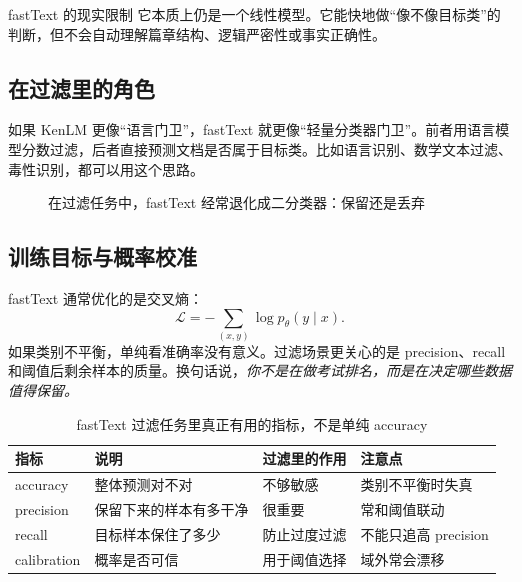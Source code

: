 \begin{warningbox}{fastText 的现实限制}
它本质上仍是一个线性模型。它能快地做“像不像目标类”的判断，但不会自动理解篇章结构、逻辑严密性或事实正确性。
\end{warningbox}

\subsection{在过滤里的角色}

如果 KenLM 更像“语言门卫”，fastText 就更像“轻量分类器门卫”。前者用语言模型分数过滤，后者直接预测文档是否属于目标类。比如语言识别、数学文本过滤、毒性识别，都可以用这个思路。

\begin{figure}[H]
\centering
{}
\caption{在过滤任务中，fastText 经常退化成二分类器：保留还是丢弃}
\end{figure}

\subsection{训练目标与概率校准}

fastText 通常优化的是交叉熵：
\[
\mathcal{L}=-\sum_{(x,y)} \log p_\theta(y\mid x).
\]
如果类别不平衡，单纯看准确率没有意义。过滤场景更关心的是 precision、recall 和阈值后剩余样本的质量。换句话说，\emph{你不是在做考试排名，而是在决定哪些数据值得保留。}

\begin{table}[H]
\centering
\small
\renewcommand{\arraystretch}{1.15}
\begin{tabular}{p{2.3cm}p{4.2cm}p{4.1cm}p{3.0cm}}
\toprule
\textbf{指标} & \textbf{说明} & \textbf{过滤里的作用} & \textbf{注意点} \\
\midrule
accuracy & 整体预测对不对 & 不够敏感 & 类别不平衡时失真 \\
precision & 保留下来的样本有多干净 & 很重要 & 常和阈值联动 \\
recall & 目标样本保住了多少 & 防止过度过滤 & 不能只追高 precision \\
calibration & 概率是否可信 & 用于阈值选择 & 域外常会漂移 \\
\bottomrule
\end{tabular}
\caption{fastText 过滤任务里真正有用的指标，不是单纯 accuracy}
\end{table}

